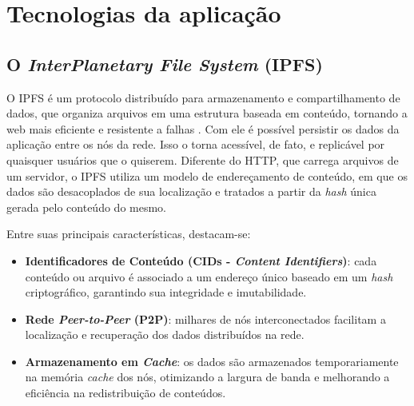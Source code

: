 \section{Tecnologias da aplicação}

\subsection{O \textit{InterPlanetary File System} (IPFS)}
\label{sec:ipfs}
O IPFS é um protocolo distribuído para armazenamento e compartilhamento de dados, que organiza arquivos em uma estrutura baseada em conteúdo, tornando a web mais eficiente e resistente a falhas \cite{ipfs2025}. Com ele é possível persistir os dados da aplicação entre os nós da rede. Isso o torna acessível, de fato, e replicável por quaisquer usuários que o quiserem. Diferente do HTTP, que carrega arquivos de um servidor, o IPFS utiliza um modelo de endereçamento de conteúdo, em que os dados são desacoplados de sua localização e tratados a partir da \textit{hash} única gerada pelo conteúdo do mesmo.

Entre suas principais características, destacam-se:

\begin{itemize}
    \item \textbf{Identificadores de Conteúdo (CIDs - \textit{Content Identifiers})}: cada conteúdo ou arquivo é associado a um endereço único baseado em um \textit{hash} criptográfico, garantindo sua integridade e imutabilidade.
    
    \item \textbf{Rede \textit{Peer-to-Peer} (P2P)}: milhares de nós interconectados facilitam a localização e recuperação dos dados distribuídos na rede.
    
    \item \textbf{Armazenamento em \textit{Cache}}: os dados são armazenados temporariamente na memória \textit{cache} dos nós, otimizando a largura de banda e melhorando a eficiência na redistribuição de conteúdos.
\end{itemize}

